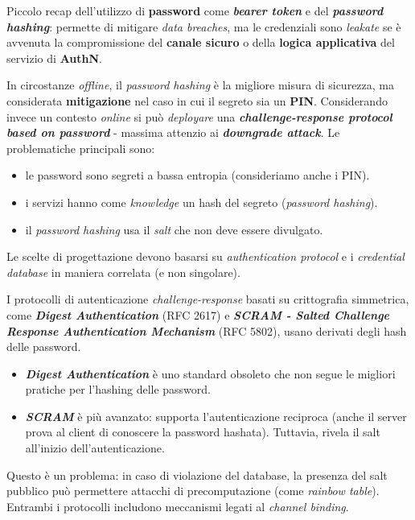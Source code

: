 \begin{flushleft}
    Piccolo recap dell'utilizzo di \textbf{password} come \textbf{\textit{bearer token}} e del \textbf{\textit{password hashing}}: permette di mitigare \textit{data breaches}, ma le credenziali sono \textit{leakate} se è avvenuta la compromissione del \textbf{canale sicuro} o della \textbf{logica applicativa} del servizio di \textbf{AuthN}.

    \smallskip

    In circostanze \textit{offline}, il \textit{password hashing} è la migliore misura di sicurezza, ma considerata \textbf{mitigazione} nel caso in cui il segreto sia un \textbf{PIN}. Considerando invece un contesto \textit{online} si può \textit{deployare} una \textbf{\textit{challenge-response protocol based on password}} - massima attenzio ai \textbf{\textit{downgrade attack}}. Le problematiche principali sono:
    \begin{itemize}[nosep]
        \item le password sono segreti a bassa entropia (consideriamo anche i PIN).
        \item i servizi hanno come \textit{knowledge} un hash del segreto (\textit{password hashing}).
        \item il \textit{password hashing} usa il \textit{salt} che non deve essere divulgato.
    \end{itemize}

    Le scelte di progettazione devono basarsi su \textit{authentication protocol} e i \textit{credential database} in maniera correlata (e non singolare).
    
    \medskip

    I protocolli di autenticazione \textit{challenge-response} basati su crittografia simmetrica, come \textbf{\textit{Digest Authentication}} (RFC 2617) e \textbf{\textit{SCRAM - Salted Challenge Response Authentication Mechanism}} (RFC 5802), usano derivati degli hash delle password.
    \begin{itemize}[nosep]
        \item \textbf{\textit{Digest Authentication}} è uno standard obsoleto che non segue le migliori pratiche per l'hashing delle password.
        \item \textbf{\textit{SCRAM}} è più avanzato: supporta l'autenticazione reciproca (anche il server prova al client di conoscere la password hashata). Tuttavia, rivela il salt all'inizio dell'autenticazione.
    \end{itemize}

    Questo è un problema: in caso di violazione del database, la presenza del salt pubblico può permettere attacchi di precomputazione (come \textit{rainbow table}). Entrambi i protocolli includono meccanismi legati al \textit{channel binding}.
\end{flushleft}

